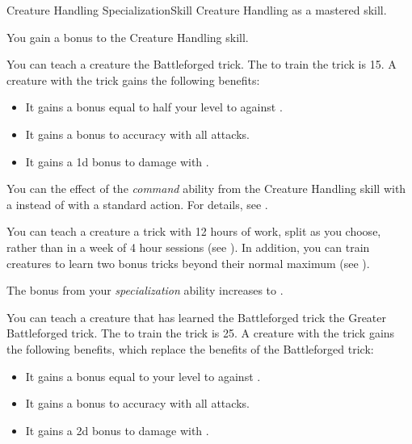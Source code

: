     \begin{feat}{Creature Handling Specialization}{Skill}
        \featpre Creature Handling as a mastered skill.

         You gain a  bonus to the Creature Handling skill.

         You can teach a creature the Battleforged trick.
        The  to train the trick is 15.
        A creature with the trick gains the following benefits:
        \begin{itemize}
            \item It gains a bonus equal to half your level to  against .
            \item It gains a  bonus to accuracy with all attacks.
            \item It gains a \plus1d bonus to damage with .
        \end{itemize}

         You can  the effect of the \textit{command} ability from the Creature Handling skill with a  instead of with a standard action.
        For details, see .

         You can teach a creature a trick with 12 hours of work, split as you choose, rather than in a week of 4 hour sessions (see ).
        In addition, you can train creatures to learn two bonus tricks beyond their normal maximum (see ).

         The bonus from your \textit{specialization} ability increases to .

         You can teach a creature that has learned the Battleforged trick the Greater Battleforged trick.
        The  to train the trick is 25.
        A creature with the trick gains the following benefits, which replace the benefits of the Battleforged trick:
        \begin{itemize}
            \item It gains a bonus equal to your level to  against .
            \item It gains a  bonus to accuracy with all attacks.
            \item It gains a \plus2d bonus to damage with .
        \end{itemize}


\end{feat}
